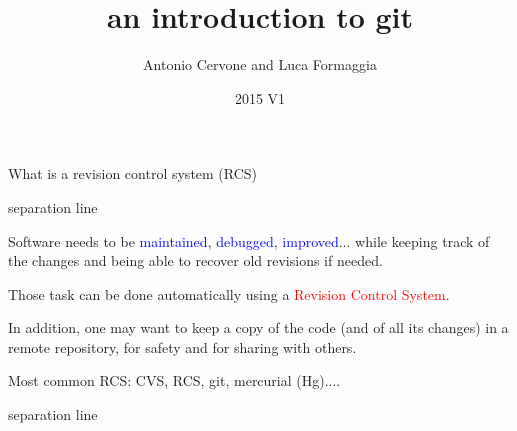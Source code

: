 \documentclass{beamer}
\author{Antonio Cervone and Luca Formaggia}
\title{an introduction to git}
\date{2015 V1}
\newcommand{\titleline}[1][0.025cm]{%
\begin{beamercolorbox}[wd=\paperwidth,ht=#1,center]{separation line}%
\end{beamercolorbox}%
}
\begin{document}
\begin{frame}
\titlepage
\end{frame}
\begin{frame}{What is a revision control system (RCS)}
\titleline
{\small
  Software needs to be \textcolor{blue}{maintained},
 \textcolor{blue}{debugged}, \textcolor{blue}{improved}...
while keeping track of the changes and being able to recover old revisions
if needed.
\smallskip

Those task can be done automatically using a \textcolor{red}{Revision Control System}.
\smallskip

In addition, one may want to keep a copy of the code (and of all its changes) in a remote repository, for safety and for sharing with others.

\smallskip

Most common RCS: CVS, RCS, git, mercurial (Hg)....
}
\titleline
\end{frame}
\end{document}
